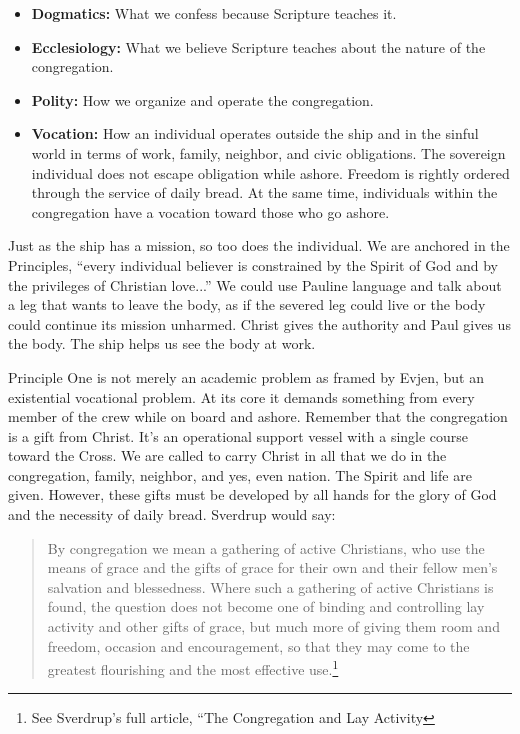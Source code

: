  \begin{itemize}
    \item \textbf{Dogmatics:} What we confess because Scripture teaches it.

    \item \textbf{Ecclesiology:} What we believe Scripture teaches about the nature of the congregation.

    \item \textbf{Polity:} How we organize and operate the congregation.

    \item \textbf{Vocation:} How an individual operates outside the ship and in the sinful world in terms of work, family, neighbor, and civic obligations. The sovereign individual does not escape obligation while ashore. Freedom is rightly ordered through the service of daily bread. At the same time, individuals within the congregation have a vocation toward those who go ashore.

\end{itemize}

Just as the ship has a mission, so too does the individual. We are anchored in the Principles, ``every individual believer is constrained by the Spirit of God and by the privileges of Christian love...'' We could use Pauline language and talk about a leg that wants to leave the body, as if the severed leg could live or the body could continue its mission unharmed. Christ gives the authority and Paul gives us the body. The ship helps us see the body at work.

Principle One is not merely an academic problem as framed by Evjen, but an existential vocational problem. At its core it demands something from every member of the crew while on board and ashore. Remember that the congregation is a gift from Christ. It's an operational support vessel with a single course toward the Cross. We are called to carry Christ in all that we do in the congregation, family, neighbor, and yes, even nation. The Spirit and life are given. However, these gifts must be developed by all hands for the glory of God and the necessity of daily bread. Sverdrup would say:

\begin{quote}
By congregation we mean a gathering of active Christians, who use the means of grace and the gifts of grace for their own and their fellow men’s salvation and blessedness. Where such a gathering of active Christians is found, the question does not become one of binding and controlling lay activity and other gifts of grace, but much more of giving them room and freedom, occasion and encouragement, so that they may come to the greatest flourishing and the most effective use.\footnote{See Sverdrup’s full article, “The Congregation and Lay Activity}
\end{quote}

